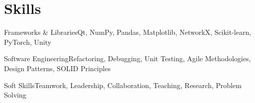 \documentclass[10pt,a4paper,sans]{moderncv}        %
\newcommand{\ExternalLink}{%
	\tikz[x=1.2ex, y=1.2ex, baseline=-0.05ex]{%
		\begin{scope}[x=1ex, y=1ex]
			\clip (-0.1,-0.1)
			--++ (-0, 1.2)
			--++ (0.6, 0)
			--++ (0, -0.6)
			--++ (0.6, 0)
			--++ (0, -1);
			\path[draw,
			line width = 0.5,
			rounded corners=0.5]
			(0,0) rectangle (1,1);
		\end{scope}
		\path[draw, line width = 0.5] (0.5, 0.5)
		-- (1, 1);
		\path[draw, line width = 0.5] (0.6, 1)
		-- (1, 1) -- (1, 0.6);
	}
}
\begin{document}





\section{Skills}

              {Frameworks \& Libraries}{Qt, NumPy, Pandas, Matplotlib, NetworkX, Scikit-learn, PyTorch, Unity}

              {Software Engineering}{Refactoring, Debugging, Unit Testing, Agile Methodologies, Design Patterns, SOLID Principles}

              {Soft Skills}{Teamwork, Leadership, Collaboration, Teaching, Research, Problem Solving}

\end{document}

